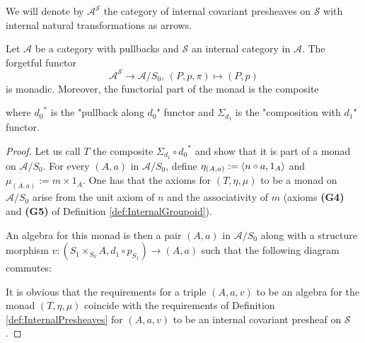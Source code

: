 We will denote by $\mathcal{A}^{\mathcal{S}}$ the category of internal covariant presheaves on $\mathcal{S}$ with internal natural transformations as arrows.
\begin{proposition}
\label{prop:PresheavesFunctorMonadic}
    Let $\mathcal{A}$ be a category with pullbacks and $\mathcal{S}$ an internal category in $\mathcal{A}$. The forgetful functor
    \[{\mathcal{A}}^{\mathcal{S}}\longrightarrow \mathcal{A}/S_0\text{, }(P,p,\pi)\mapsto (P,p)\]
    is monadic. Moreover, the functorial part of the monad is the composite
    \begin{center}
    \end{center}
    where ${d_0}^*$ is the "pullback along $d_0$" functor and $\Sigma_{d_1}$ is the "composition with $d_1$" functor.
    \begin{proof}
        Let us call $T$ the composite $\Sigma_{d_1}\circ {d_0}^*$ and show that it is part of a monad on $\mathcal{A}/S_0$.
        For every $(A,a)$ in $\mathcal{A}/S_0$, define $\eta_{(A,a)}:=\langle{n\circ a},{1_A}\rangle$ and $\mu_{(A,a)}:=m\times 1_A$. One has that the axioms for $(T,\eta, \mu)$ to be a monad on $\mathcal{A}/S_0$ arise from the unit axiom of $n$ and the associativity of $m$ (axioms \textbf{(G4)} and \textbf{(G5)} of Definition \ref{def:InternalGroupoid}).

        An algebra for this monad is then a pair $(A,a)$ in $\mathcal{A}/S_0$ along with a structure morphism $v:(S_1\times_{S_0}A,d_1\circ p_{S_1})\longrightarrow (A,a)$ such that the following diagram commutes:
        \begin{center}
        \end{center}
        It is obvious that the requirements for a triple $(A,a,v)$ to be an algebra for the monad $(T,\eta,\mu)$ coincide with the requirements of Definition \ref{def:InternalPresheaves} for $(A,a,v)$ to be an internal covariant presheaf on $\mathcal{S}$.
    \end{proof}
\end{proposition}

